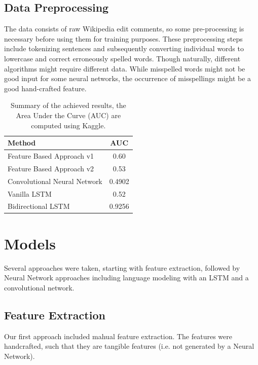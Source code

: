 \documentclass[10pt, a4paper]{article}
\begin{document}
	\begin{multicols}{2}
		
		
		\subsection*{Data Preprocessing}
		The data consists of raw Wikipedia edit comments, so some pre-processing is necessary before using them for training purposes. These preprocessing steps include tokenizing sentences and subsequently converting individual words to lowercase and correct erroneously spelled words. Though  naturally, different algorithms might require different data. While misspelled words might not be good input for some neural networks, the occurrence of misspellings might be a good hand-crafted feature.
		
		\begin{table}[t]
			\centering
			\begin{tabular}{l|c}
				\toprule
				\textbf{Method} & \textbf{AUC} \\
				\midrule
				Feature Based Approach v1 & 0.60   \\
				Feature Based Approach v2 & 0.53 \\
				Convolutional Neural Network & 0.4902 \\
				Vanilla LSTM & 0.52 \\
				Bidirectional LSTM & 0.9256 \\
				\bottomrule
			\end{tabular}
			\caption{Summary of the achieved results, the Area Under the Curve (AUC) are computed using Kaggle.}
			\label{table:summary_results}
		\end{table}
		
		
		\section{Models}
		Several approaches were taken, starting with feature extraction, followed by Neural Network approaches including language modeling with an LSTM and a convolutional network.
		
		\subsection{Feature Extraction}
		Our first approach included mahual feature extraction. The features were handcrafted, such that they are tangible features (i.e. not generated by a Neural Network).

\end{multicols}
\end{document}
